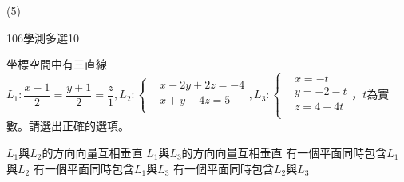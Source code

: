 \begin{QUESTIONS}
\begin{QUESTION}
\begin{QBODY}
        \end{QBODY}
        \begin{QFROMS}
        \end{QFROMS}
        \begin{QTAGS}\end{QTAGS}
        \begin{QANS}
            (5)
        \end{QANS}
        \begin{QSOLLIST}
        \end{QSOLLIST}
        \begin{QEMPTYSPACE}
        \end{QEMPTYSPACE}
    \end{QUESTION}
    \begin{QUESTION}
        \begin{ExamInfo}{106}{學測}{多選}{10}
        \end{ExamInfo}
        \begin{ExamAnsRateInfo}{43}{66}{39}{24}
        \end{ExamAnsRateInfo}
        \begin{QBODY}
			坐標空間中有三直線${{L}_{1}}:\dfrac{x-1}{2}=\dfrac{y+1}{2}=\dfrac{z}{1},{{L}_{2}}:\left\{ \begin{aligned}
			& x-2y+2z=-4 \\ 
			& x+y-4z=5 \\ 
			\end{aligned} \right.,{{L}_{3}}:\left\{ \begin{aligned}
			& x=-t \\ 
			& y=-2-t \\ 
			& z=4+4t \\ 
			\end{aligned} \right.$，$t$為實數。請選出正確的選項。
			\begin{QOPS}
				\QOP ${{L}_{1}}$與${{L}_{2}}$的方向向量互相垂直
				\QOP ${{L}_{1}}$與${{L}_{3}}$的方向向量互相垂直
				\QOP 有一個平面同時包含${{L}_{1}}$與${{L}_{2}}$
				\QOP 有一個平面同時包含${{L}_{1}}$與${{L}_{3}}$
				\QOP 有一個平面同時包含${{L}_{2}}$與${{L}_{3}}$
			\end{QOPS}
        \end{QBODY}
        \begin{QFROMS}
        \end{QFROMS}
        \begin{QTAGS}\end{QTAGS}
        \begin{QANS}

\end{QANS}
\end{QUESTION}
\end{QUESTIONS}
